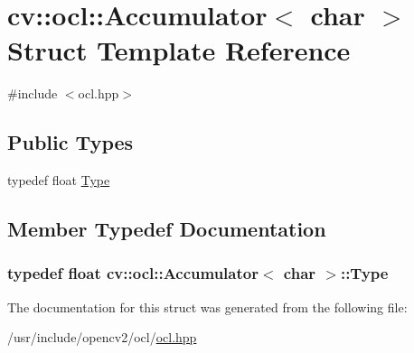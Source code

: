 \hypertarget{structcv_1_1ocl_1_1Accumulator_3_01char_01_4}{\section{cv\-:\-:ocl\-:\-:Accumulator$<$ char $>$ Struct Template Reference}
\label{structcv_1_1ocl_1_1Accumulator_3_01char_01_4}
}


{\ttfamily \#include $<$ocl.\-hpp$>$}

\subsection*{Public Types}
\begin{DoxyCompactItemize}
\item 
typedef float \hyperlink{structcv_1_1ocl_1_1Accumulator_3_01char_01_4_ac43f4bd59c0fb3366f35d878cbd56660}{Type}
\end{DoxyCompactItemize}


\subsection{Member Typedef Documentation}
\hypertarget{structcv_1_1ocl_1_1Accumulator_3_01char_01_4_ac43f4bd59c0fb3366f35d878cbd56660}{
\subsubsection[{Type}]{\setlength{\rightskip}{0pt plus 5cm}typedef float {\bf cv\-::ocl\-::\-Accumulator}$<$ char $>$\-::{\bf Type}}}\label{structcv_1_1ocl_1_1Accumulator_3_01char_01_4_ac43f4bd59c0fb3366f35d878cbd56660}


The documentation for this struct was generated from the following file\-:\begin{DoxyCompactItemize}
\item 
/usr/include/opencv2/ocl/\hyperlink{ocl_2ocl_8hpp}{ocl.\-hpp}\end{DoxyCompactItemize}
